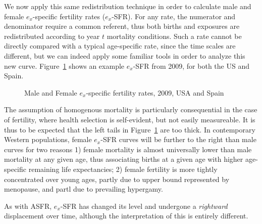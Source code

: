 We now apply this same redistribution technique in order to
calculate male and female $e_x$-specific fertility rates ($e_x$-SFR). For any
rate, the numerator and denominator require a common referent, thus both births and
exposures are redistributed according to year $t$ mortality conditions. Such a
rate cannot be directly compared with a typical age-specific rate, since the
time scales are different, but we can indeed apply some familiar tools in order
to analyze this new curve. Figure~\ref{fig:eSFR2009} shows an example $e_x$-SFR
from 2009, for both the US and Spain.

\begin{figure}[ht!]
        \centering  
          \caption{Male and Female $e_x$-specific fertility rates, 2009, USA and
          Spain}
          \label{fig:eSFR2009}
\end{figure}

The assumption of homogenous mortality is particularly consequential in the case
of fertility, where health selection is self-evident, but not easily measureable.
It is thus to be expected that the left tails in Figure~\ref{fig:eSFR2009} are
too thick. In contemporary Western populations, female $e_x$-SFR curves will be
further to the right than male curves for two reasons 1) female mortality is
almost universally lower than male mortality at any given age, thus associating
births at a given age with higher age-specific remaining life expectancies; 2)
female fertility is more tightly concentrated over young ages, partly due to
upper bound represented by menopause, and partl due to prevailing hypergamy. 

As with ASFR, $e_x$-SFR has changed its level and undergone a \textit{rightward}
displacement over time, although the interpretation of this is entirely
different.






